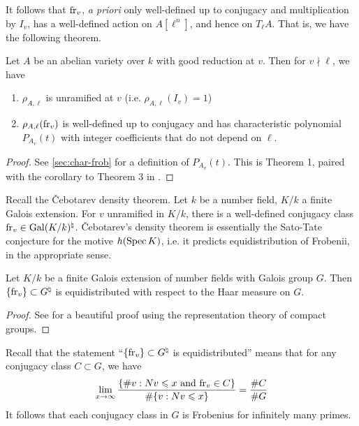 It follows that $\mathrm{fr}_v$, \emph{a priori} only well-defined up to conjugacy 
and multiplication by $I_v$, has a well-defined action on $A[\ell^n]$, and 
hence on $T_\ell A$. That is, we have the following theorem. 

\begin{theorem}\label{thm:ab-var-good}
Let $A$ be an abelian variety over $k$ with good reduction at $v$. Then for 
$v\nmid \ell$, we have  
\begin{enumerate}
  \item $\rho_{A,\ell}$ is unramified at $v$ (i.e. $\rho_{A,\ell}(I_v) = 1$) 
  \item $\rho_{A,\ell}(\mathrm{fr}_v)$ is well-defined up to conjugacy and has 
    characteristic polynomial $P_{A_v}(t)$ with integer coefficients that do 
    not depend on $\ell$. 
\end{enumerate}
\end{theorem}
\begin{proof}
See \ref{sec:char-frob} for a definition of $P_{A_v}(t)$. This is Theorem 1, 
paired with the corollary to Theorem 3 in \cite{st68}. 
\end{proof}

Recall the \v Cebotarev density theorem. Let $k$ be a number field, $K/k$ a 
finite Galois extension. For $v$ unramified in $K/k$, there is a well-defined 
conjugacy class $\mathrm{fr}_v\in \operatorname{Gal}(K/k)^\natural$. \v Cebotarev's density theorem 
is essentially the Sato-Tate conjecture for the motive 
$h(\operatorname{Spec} K)$, i.e. it predicts equidistribution of Frobenii, in the appropriate 
sense. 

\begin{theorem}[\v Cebotarev]
Let $K/k$ be a finite Galois extension of number fields with Galois group $G$. Then 
$\{\mathrm{fr}_v\}\subset G^\natural$ is equidistributed with respect to the Haar 
measure on $G$. 
\end{theorem}
\begin{proof}
See \cite[1.2.2]{se68} for a beautiful proof using the representation theory of 
compact groups. 
\end{proof}

Recall that the statement ``$\{\mathrm{fr}_v\}\subset G^\natural$ is 
equidistributed'' means that for any conjugacy class $C\subset G$, we have 
\[
  \lim_{x \to \infty} \frac{\{\# v : N v \leqslant x \text{ and } \mathrm{fr}_v\in C\}}{\# \{v:N v\leqslant x\}} = \frac{\# C}{\# G}
\]
It follows that each conjugacy class in $G$ is Frobenius for infinitely many 
primes.  

